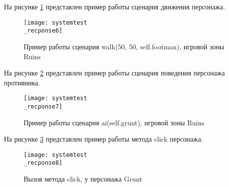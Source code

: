 На рисунке \ref{systemtest_recponse6:image} представлен пример работы сценария движения персонажа.
\begin{figure}[H]
	\centering
	\texttt{[image: systemtest\\\_recponse6]}
	\caption{Пример работы сценария walk(50, 50, self.footman), игровой зоны Ruins}
	\label{systemtest_recponse6:image}
\end{figure}

На рисунке \ref{systemtest_recponse7:image} представлен пример работы сценария поведения персонажа противника.
\begin{figure}[H]
	\centering
	\texttt{[image: systemtest\\\_recponse7]}
	\caption{Пример работы сценария ai(self.grunt), игровой зоны Ruins}
	\label{systemtest_recponse7:image}
\end{figure}

На рисунке \ref{systemtest_recponse8:image} представлен пример работы метода click персонажа.
\begin{figure}[H]
	\centering
	\texttt{[image: systemtest\\\_recponse8]}
	\caption{Вызов метода click, у персонажа Grunt}
	\label{systemtest_recponse8:image}
\end{figure}